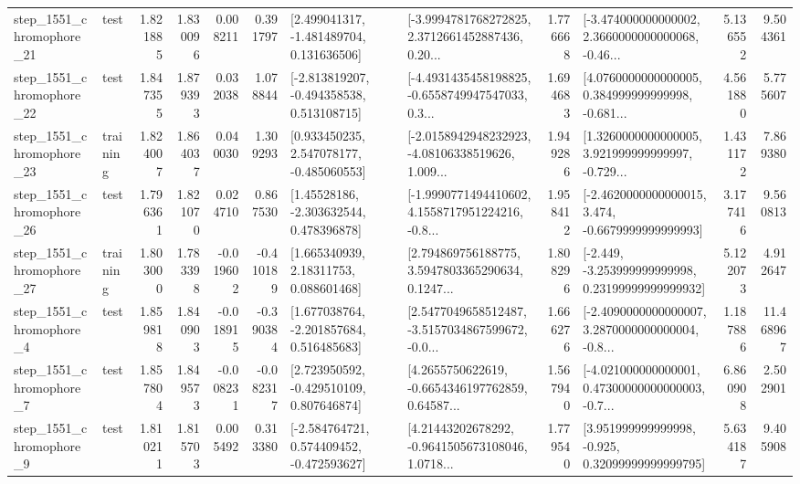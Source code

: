 \begin{tabular}{llrrrrllrlrr}
 step\_1551\_chromophore\_21 &      test &      1.821885 &    1.830096 &      0.008211 &  0.391797 &    [2.499041317, -1.481489704, 0.131636506] &  [-3.9994781768272825, 2.3712661452887436, 0.20... &       1.776668 &  [-3.474000000000002, 2.3660000000000068, -0.46... &            5.136552 &          9.504361 \\
 step\_1551\_chromophore\_22 &      test &      1.847355 &    1.879393 &      0.032038 &  1.078844 &   [-2.813819207, -0.494358538, 0.513108715] &  [-4.4931435458198825, -0.6558749947547033, 0.3... &       1.694683 &  [4.0760000000000005, 0.384999999999998, -0.681... &            4.561880 &          5.775607 \\
 step\_1551\_chromophore\_23 &  training &      1.824007 &    1.864037 &      0.040030 &  1.309293 &    [0.933450235, 2.547078177, -0.485060553] &  [-2.0158942948232923, -4.08106338519626, 1.009... &       1.949286 &  [1.3260000000000005, 3.921999999999997, -0.729... &            1.431172 &          7.869380 \\
 step\_1551\_chromophore\_26 &      test &      1.796361 &    1.821070 &      0.024710 &  0.867530 &     [1.45528186, -2.303632544, 0.478396878] &  [-1.9990771494410602, 4.1558717951224216, -0.8... &       1.958412 &  [-2.4620000000000015, 3.474, -0.6679999999999993] &            3.177416 &          9.560813 \\
 step\_1551\_chromophore\_27 &  training &      1.803000 &    1.783398 &     -0.019602 & -0.410189 &      [1.665340939, 2.18311753, 0.088601468] &  [2.794869756188775, 3.5947803365290634, 0.1247... &       1.808296 &  [-2.449, -3.253999999999998, 0.23199999999999932] &            5.122073 &          4.912647 \\
  step\_1551\_chromophore\_4 &      test &      1.859818 &    1.840903 &     -0.018915 & -0.390384 &    [1.677038764, -2.201857684, 0.516485683] &  [2.5477049658512487, -3.5157034867599672, -0.0... &       1.666276 &  [-2.4090000000000007, 3.2870000000000004, -0.8... &            1.187886 &         11.468967 \\
  step\_1551\_chromophore\_7 &      test &      1.857804 &    1.849573 &     -0.008231 & -0.082317 &    [2.723950592, -0.429510109, 0.807646874] &  [4.2655750622619, -0.6654346197762859, 0.64587... &       1.567940 &  [-4.021000000000001, 0.47300000000000003, -0.7... &            6.860908 &          2.502901 \\
  step\_1551\_chromophore\_9 &      test &      1.810211 &    1.815703 &      0.005492 &  0.313380 &   [-2.584764721, 0.574409452, -0.472593627] &  [4.21443202678292, -0.9641505673108046, 1.0718... &       1.779540 &   [3.951999999999998, -0.925, 0.32099999999999795] &            5.634187 &          9.405908 \\

\end{tabular}
